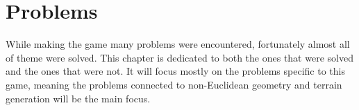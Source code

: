 \chapter{Problems} \label{ch:problems}
While making the game many problems were encountered, fortunately almost all of theme were solved.
This chapter is dedicated to both the ones that were solved and the ones that were not.
It will focus mostly on the problems specific to this game, meaning the problems connected to non-Euclidean geometry and terrain generation will be the main focus.




